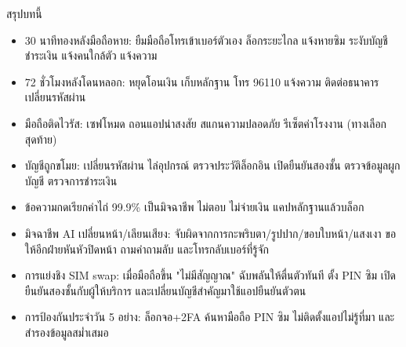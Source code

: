 \begin{tcbsummary}{สรุปบทนี้}
\begin{itemize}
  \item 30 นาทีทองหลังมือถือหาย: ยืมมือถือโทรเข้าเบอร์ตัวเอง ล็อกระยะไกล แจ้งหายซิม ระงับบัญชีชำระเงิน แจ้งคนใกล้ตัว แจ้งความ
  \item 72 ชั่วโมงหลังโดนหลอก: หยุดโอนเงิน เก็บหลักฐาน โทร 96110 แจ้งความ ติดต่อธนาคาร เปลี่ยนรหัสผ่าน
  \item มือถือติดไวรัส: เซฟโหมด ถอนแอปน่าสงสัย สแกนความปลอดภัย รีเซ็ตค่าโรงงาน (ทางเลือกสุดท้าย)
  \item บัญชีถูกขโมย: เปลี่ยนรหัสผ่าน ไล่อุปกรณ์ ตรวจประวัติล็อกอิน เปิดยืนยันสองชั้น ตรวจข้อมูลผูกบัญชี ตรวจการชำระเงิน
  \item ข้อความกดเรียกค่าไถ่ 99.9\% เป็นมิจฉาชีพ ไม่ตอบ ไม่จ่ายเงิน แคปหลักฐานแล้วบล็อก
  \item มิจฉาชีพ AI เปลี่ยนหน้า/เลียนเสียง: จับผิดจากการกะพริบตา/รูปปาก/ขอบใบหน้า/แสงเงา ขอให้อีกฝ่ายหันหัวปิดหน้า ถามคำถามลับ และโทรกลับเบอร์ที่รู้จัก
  \item การแย่งชิง SIM swap: เมื่อมือถือขึ้น "ไม่มีสัญญาณ" ฉับพลันให้ตื่นตัวทันที ตั้ง PIN ซิม เปิดยืนยันสองชั้นกับผู้ให้บริการ และเปลี่ยนบัญชีสำคัญมาใช้แอปยืนยันตัวตน
  \item การป้องกันประจำวัน 5 อย่าง: ล็อกจอ+2FA ค้นหามือถือ PIN ซิม ไม่ติดตั้งแอปไม่รู้ที่มา และสำรองข้อมูลสม่ำเสมอ
\end{itemize}

\end{tcbsummary}
